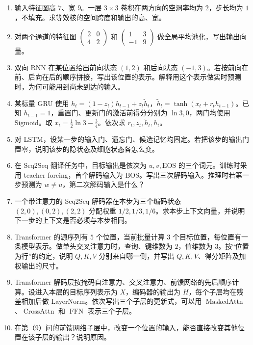 \begin{enumerate}[label=(\arabic*)]
\item 输入特征图高 $7$、宽 $9$。一层 $3\times3$ 卷积在两方向的空洞率均为 $2$，步长均为 $1$，不填充。求等效核的空间跨度和输出的高、宽。
\item 对两个通道的特征图 $\begin{pmatrix}2&0\\4&2\end{pmatrix}$ 和 $\begin{pmatrix}1&3\\-1&9\end{pmatrix}$ 做全局平均池化，写出输出向量。
\item 双向 RNN 在某位置给出前向状态 $(1,2)$ 和后向状态 $(-1,3)$。若按前向在前、后向在后的顺序拼接，写出该位置的表示。解释用这个表示做实时预测时，为何可能用到尚未到达的输入。
\item 某标量 GRU 使用 $h_t=(1-z_t)h_{t-1}+z_t\widetilde h_t$，$\widetilde h_t=\tanh(x_t+r_t h_{t-1})$。已知 $h_{t-1}=1$，重置门、更新门的激活前得分分别为 $\ln 3,0$，两门均使用 Sigmoid。取 $x_t=\tfrac12\ln 3-\tfrac34$。依次求 $r_t,z_t,\widetilde h_t,h_t$。
\item 对 LSTM，设某一步的输入门、遗忘门、候选记忆均固定。若把该步的输出门置零，说明该步的隐状态及细胞状态各怎么变。
\item 在 Seq2Seq 翻译任务中，目标输出是依次为 $u,v,\mathrm{EOS}$ 的三个词元。训练时采用 teacher forcing，首个解码输入为 $\mathrm{BOS}$。写出三次解码输入。推理时若第一步预测为 $w\ne u$，第二次解码输入是什么？
\item 一个带注意力的 Seq2Seq 解码器在本步为三个编码状态 $(2,0),(0,2),(2,2)$ 分配权重 $1/2,1/3,1/6$。求本步上下文向量，并说明下一步的上下文是否必须与本步相同。
\item Transformer 的源序列有 $5$ 个位置，当前批量计算 $3$ 个目标位置，每位置有一条模型表示。做单头交叉注意力时，查询、键维数为 $2$，值维数为 $3$。按“位置为行”的约定，说明 $Q,K,V$ 分别来自哪一侧，并写出 $Q,K,V$、得分矩阵及加权输出的尺寸。
\item Transformer 解码层按掩码自注意力、交叉注意力、前馈网络的先后顺序计算。设进入本层的目标序列表示为 $X$，编码器的输出为 $H$，每个子层均在残差相加后做 LayerNorm。依次写出三个子层的更新式，可以用 $\operatorname{MaskedAttn}$、$\operatorname{CrossAttn}$ 和 $\operatorname{FFN}$ 表示三个子层。
\item 在第（9）问的前馈网络子层中，改变一个位置的输入，能否直接改变其他位置在该子层的输出？说明原因。
\end{enumerate}

